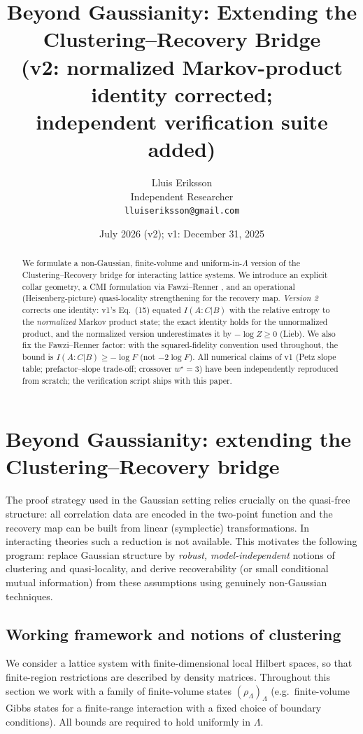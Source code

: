\documentclass[11pt]{article}
\title{Beyond Gaussianity: Extending the Clustering--Recovery Bridge\\
{\large (v2: normalized Markov-product identity corrected;\\ independent verification suite added)}}
\author{Lluis Eriksson\\ Independent Researcher\\ \texttt{lluiseriksson@gmail.com}}
\date{July 2026 (v2); v1: December 31, 2025}
\begin{document}
\maketitle

\begin{abstract}
We formulate a non-Gaussian, finite-volume and uniform-in-$\Lambda$ version of
the Clustering--Recovery bridge for interacting lattice systems. We introduce
an explicit collar geometry, a CMI formulation via Fawzi--Renner \cite{FR},
and an operational (Heisenberg-picture) quasi-locality strengthening for the
recovery map. \emph{Version 2} corrects one identity: v1's Eq.~(15)
equated $I(A:C|B)$ with the relative entropy to the \emph{normalized} Markov
product state; the exact identity holds for the unnormalized product, and the
normalized version underestimates it by $-\log Z \ge 0$ (Lieb).
We also fix the Fawzi--Renner factor: with the squared-fidelity convention
used throughout, the bound is $I(A:C|B) \ge -\log F$ (not $-2\log F$). All numerical claims of
v1 (Petz slope table; prefactor--slope trade-off; crossover $w^\star=3$) have
been independently reproduced from scratch; the verification script ships with
this paper.
\end{abstract}

\section{Beyond Gaussianity: extending the Clustering--Recovery bridge}

The proof strategy used in the Gaussian setting \cite{Companion0060} relies
crucially on the quasi-free structure: all correlation data are encoded in the
two-point function and the recovery map can be built from linear (symplectic)
transformations. In interacting theories such a reduction is not available.
This motivates the following program: replace Gaussian structure by
\emph{robust, model-independent} notions of clustering and quasi-locality, and
derive recoverability (or small conditional mutual information) from these
assumptions using genuinely non-Gaussian techniques.

\subsection{Working framework and notions of clustering}

We consider a lattice system with finite-dimensional local Hilbert spaces, so
that finite-region restrictions are described by density matrices. Throughout
this section we work with a family of finite-volume states
$(\rho_\Lambda)_\Lambda$ (e.g.\ finite-volume Gibbs states for a finite-range
interaction with a fixed choice of boundary conditions). All bounds are
required to hold uniformly in $\Lambda$.
\end{document}
